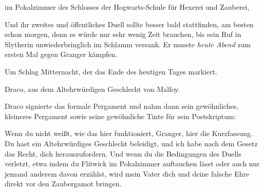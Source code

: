\begin{writtenNote}
im Pokalzimmer des Schlosses der Hogwarts-Schule für Hexerei und Zauberei,
\end{writtenNote}

Und ihr zweites und öffentliches Duell sollte besser bald stattfinden, am besten schon morgen, denn es würde nur sehr wenig Zeit brauchen, bis sein Ruf in Slytherin unwiederbringlich im Schlamm versank. Er musste \emph{heute Abend} zum ersten Mal gegen Granger kämpfen.

\begin{writtenNote}
Um Schlag Mitternacht, der das Ende des heutigen Tages markiert.

Draco, aus dem Altehrwürdigen Geschlecht von Malfoy.
\end{writtenNote}

Draco signierte das formale Pergament und nahm dann sein gewöhnliches, kleineres Pergament sowie seine gewöhnliche Tinte für sein Postskriptum:

\begin{writtenNote}
Wenn du nicht weißt, wie das hier funktioniert, Granger, hier die Kurzfassung. Du hast ein Altehrwürdiges Geschlecht beleidigt, und ich habe nach dem Gesetz das Recht, dich herauszufordern. Und wenn du die Bedingungen des Duells verletzt, etwa indem du Flitwick im Pokalzimmer auftauchen lässt oder auch nur jemand anderem davon erzählst, wird mein Vater dich und deine falsche Ehre direkt vor den Zaubergamot bringen.

\end{writtenNote}

